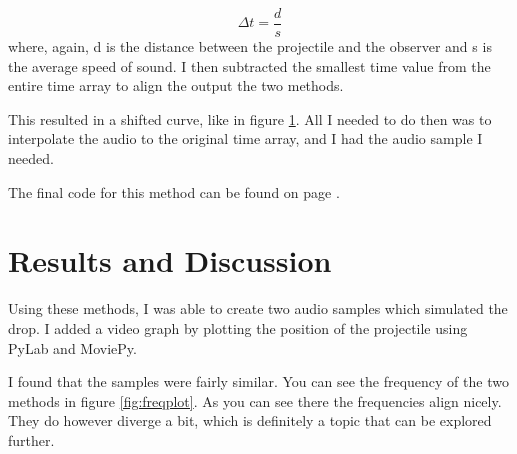 \documentclass[%
 reprint,
 amsmath,amssymb,
 aps,
]{revtex4-1}
\begin{document}
\begin{equation}\label{eq:sspeedav}
\Delta t = \dfrac{d}{s}
\end{equation}
where, again, d is the distance between the projectile and the observer and s is the average speed of sound. I then subtracted the smallest time value from the entire time array to align the output the two methods.

This resulted in a shifted curve, like in figure \ref{fig:manshift}. All I needed to do then was to interpolate the audio to the original time array, and I had the audio sample I needed.

\begin{figure}\label{fig:manshift}
\end{figure}

The final code for this method can be found on page \pageref{sec:codemethod2}.

\section{\label{sec:results}Results and Discussion}

Using these methods, I was able to create two audio samples which simulated the drop. I added a video graph by plotting the position of the projectile using PyLab and MoviePy. 

I found that the samples were fairly similar. You can see the frequency of the two methods in figure \ref{fig:freqplot}. As you can see there the frequencies align nicely. They do however diverge a bit,  which is definitely a topic that can be explored further.
\end{document}
